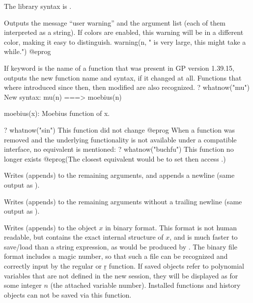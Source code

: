 {The library syntax is .

\label{se:warning}
Outputs the message ``user warning''
and the argument list (each of them interpreted as a string).
If colors are enabled, this warning will be in a different color,
making it easy to distinguish.
\bprog
warning(n, " is very large, this might take a while.")
@eprog

\label{se:whatnow}
If keyword  is the name of a function that was present in GP
version 1.39.15, outputs the new function name and syntax, if it
changed at all. Functions that where introduced since then, then modified
are also recognized.
\bprog
? whatnow("mu")
New syntax: mu(n) ===> moebius(n)

moebius(x): Moebius function of x.

? whatnow("sin")
This function did not change
@eprog When a function was removed and the underlying functionality
is not available under a compatible interface, no equivalent is mentioned:
\bprog
? whatnow("buchfu")
This function no longer exists
@eprog\noindent (The closest equivalent would be to set 
then access .)

\label{se:write}
Writes (appends) to  the remaining arguments, and appends a
newline (same output as ).

\label{se:write1}
Writes (appends) to  the remaining arguments without a
trailing newline (same output as ).

\label{se:writebin}
Writes (appends) to
 the object $x$ in binary format. This format is not human
readable, but contains the exact internal structure of $x$, and is much
faster to save/load than a string expression, as would be produced by
. The binary file format includes a magic number, so that such a
file can be recognized and correctly input by the regular  or \b{r}
function. If saved objects refer to polynomial variables that are not
defined in the new session, they will be displayed as  for some
integer $n$ (the attached variable number).
Installed functions and history objects can not be saved via this function.

}
